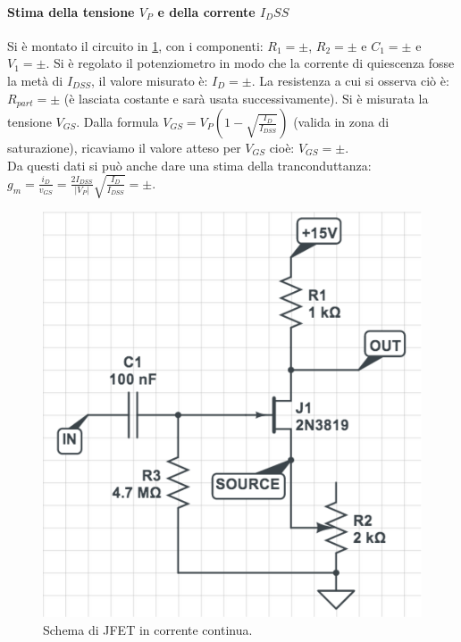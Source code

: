 \documentclass[10pt,a4paper]{article}
\begin{document}
\paragraph{Stima della tensione $V_P$ e della corrente $I_DSS$}
Si è montato il circuito in \ref{circuito2}, con i componenti: $R_1 = \pm$, $R_2 = \pm $ e $C_1 = \pm$ e $V_1 = \pm $. Si è regolato il potenziometro in modo che la corrente di quiescenza fosse la metà di $I_{DSS}$, il valore misurato è: $I_D = \pm $. La resistenza a cui si osserva ciò è: $R_{part} = \pm $ (è lasciata costante e sarà usata successivamente). Si è misurata la tensione $V_{GS}$. Dalla formula $V_{GS} = V_{P} \left( 1 - \sqrt{\frac{I_D}{I_{DSS}}} \right)$ (valida in zona di saturazione), ricaviamo il valore atteso per $V_{GS}$ cioè: $V_{GS} =  \pm$.\\ 
Da questi dati si può anche dare una stima della tranconduttanza: $g_m = \frac{i_D}{v_{GS}} = \frac{2I_{DSS}}{\vert V_P \vert} \sqrt{\frac{I_D}{I_{DSS}}} = \pm$. 

\begin{figure}
\centering
\includegraphics[scale=0.4]{circuito2.png}
\caption{Schema di JFET in corrente continua.\label{circuito2}}
\end{figure}
\end{document}
